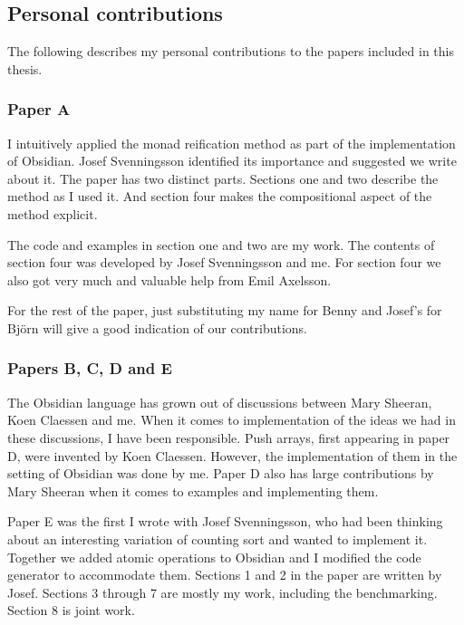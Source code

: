 \documentclass[a4paper]{book}
\begin{document}
\clearpage
\subsection*{Personal contributions} 

The following describes my personal contributions to the papers included 
in this thesis. 

\subsubsection{Paper A}
I intuitively applied the monad reification method as part of the implementation 
of Obsidian. Josef Svenningsson identified its importance and suggested we write 
about it. The paper has two distinct parts. Sections one and two describe the 
method as I used it. And section four makes the compositional aspect of the method 
explicit. 

The code and examples in section one and two are my work. The contents of section four was 
developed by Josef Svenningsson and me. For section four we also got very much and valuable help 
from Emil Axelsson. 

For the rest of the paper, just substituting my name for Benny and Josef's for Bj\"orn
will give a good indication of our contributions. 

\subsubsection{Papers B, C, D and E} 
The Obsidian language has grown out of discussions between Mary Sheeran, Koen Claessen and me. 
When it comes to implementation of the ideas we had in these discussions, I have been responsible. 
Push arrays, first appearing in paper D, were invented by Koen Claessen. However, the 
implementation of them in the setting of Obsidian was done by me. Paper D also has large 
contributions by Mary Sheeran when it comes to examples and implementing them. 

Paper E was the first I wrote with Josef Svenningsson, who had been thinking about an interesting
variation of counting sort and wanted to implement it. Together we added atomic operations to 
Obsidian and I modified the code generator to accommodate them. Sections 
1 and 2 in the paper are written by Josef. Sections 3 through 7 are mostly my work, including 
the benchmarking. Section 8 is joint work.
\end{document}
